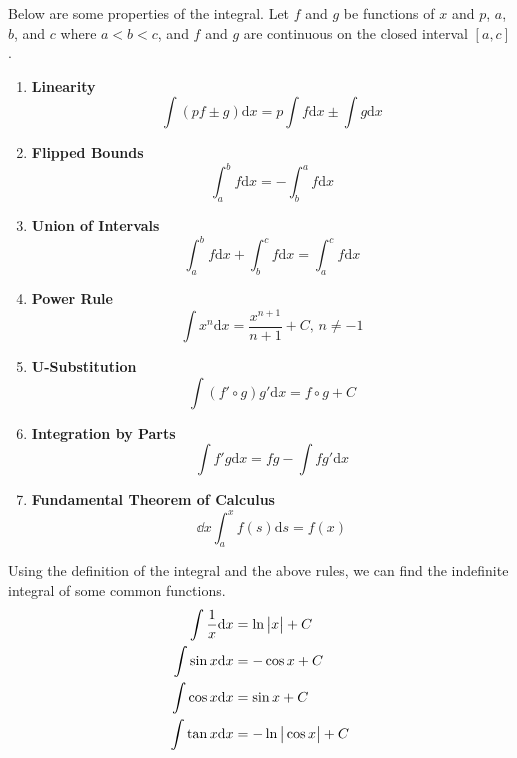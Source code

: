\noindent
Below are some properties of the integral. Let $f$ and $g$ be functions of $x$ and $p$, $a$, $b$, and $c$ where $a < b < c$, and $f$ and $g$ are continuous on the closed interval $[a,c]$.
\begin{enumerate}[label=]
	\item \textbf{Linearity}
	\begin{equation*}
		\int{(pf \pm g) \mathrm{d}x} = p\int{f \mathrm{d}x} \pm \int{g \mathrm{d}x}
	\end{equation*}
	\item \textbf{Flipped Bounds}
	\begin{equation*}
		\int_{a}^{b}{f \mathrm{d}x} = -\int_{b}^{a}{f \mathrm{d}x}
	\end{equation*}
	\item \textbf{Union of Intervals}
	\begin{equation*}
		\int_{a}^{b}{f \mathrm{d}x} + \int_{b}^{c}{f \mathrm{d}x} = \int_{a}^{c}{f \mathrm{d}x}
	\end{equation*}
	\item \textbf{Power Rule}
	\begin{equation*}
		\int{x^n \mathrm{d}x} = \frac{x^{n+1}}{n+1} + C \text{, }n \neq -1
	\end{equation*}
	\item \textbf{U-Substitution}
	\begin{equation*}
		\int{\left(f'\circ g\right) g' \mathrm{d}x} = f\circ g+ C
	\end{equation*}
	\item \textbf{Integration by Parts}
	\begin{equation*}
		\int{f' g \mathrm{d}x} = fg - \int{fg' \mathrm{d}x}
	\end{equation*}
	\item \textbf{Fundamental Theorem of Calculus}
	\begin{equation*}
		\dd{}{x}\int_{a}^{x}{f(s) \mathrm{d}s} = f(x)
	\end{equation*}
\end{enumerate}
Using the definition of the integral and the above rules, we can find the indefinite integral of some common functions.
\begin{align*}
	\int{\frac{1}{x} \mathrm{d}x} &= \ln{\big\lvert x \big\rvert} + C \\
	\int{\sin{x} \mathrm{d}x} &= -\cos{x} + C \\
	\int{\cos{x} \mathrm{d}x} &= \sin{x} + C \\
	\int{\tan{x} \mathrm{d}x} &= -\ln{\big\lvert \cos{x} \big\rvert} + C
\end{align*}